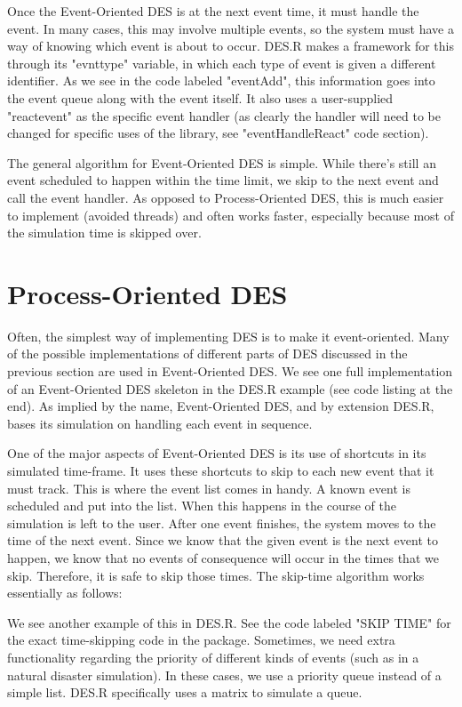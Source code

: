 \documentclass[a4paper, 11pt]{article} %
\begin{document}
Once the Event-Oriented DES is at the next event time, it must handle the event. In many cases, this may involve multiple events, so the system must have a way of knowing which event is about to occur. DES.R makes a framework for this through its "evnttype" variable, in which each type of event is given a different identifier. As we see in the code labeled "eventAdd", this information goes into the event queue along with the event itself. It also uses a user-supplied "reactevent" as the specific event handler (as clearly the handler will need to be changed for specific uses of the library, see "eventHandleReact" code section). 

The general algorithm for Event-Oriented DES is simple. While there's still an event scheduled to happen within the time limit, we skip to the next event and call the event handler. As opposed to Process-Oriented DES, this is much easier to implement (avoided threads) and often works faster, especially because most of the simulation time is skipped over. \pagebreak


\section*{Process-Oriented DES}

Often, the simplest way of implementing DES is to make it event-oriented. Many of the possible implementations of different parts of DES discussed in the previous section are used in Event-Oriented DES. We see one full implementation of an Event-Oriented DES skeleton in the DES.R example (see code listing at the end). As implied by the name, Event-Oriented DES, and by extension DES.R, bases its simulation on handling each event in sequence. 

One of the major aspects of Event-Oriented DES is its use of shortcuts in its simulated time-frame. It uses these shortcuts to skip to each new event that it must track. This is where the event list comes in handy. A known event is scheduled and put into the list. When this happens in the course of the simulation is left to the user. After one event finishes, the system moves to the time of the next event. Since we know that the given event is the next event to happen, we know that no events of consequence will occur in the times that we skip. Therefore, it is safe to skip those times. The skip-time algorithm works essentially as follows: 

We see another example of this in DES.R. See the code labeled "SKIP TIME" for the exact time-skipping code in the package. Sometimes, we need extra functionality regarding the priority of different kinds of events (such as in a natural disaster simulation). In these cases, we use a priority queue instead of a simple list. DES.R specifically uses a matrix to simulate a queue.
\end{document}
